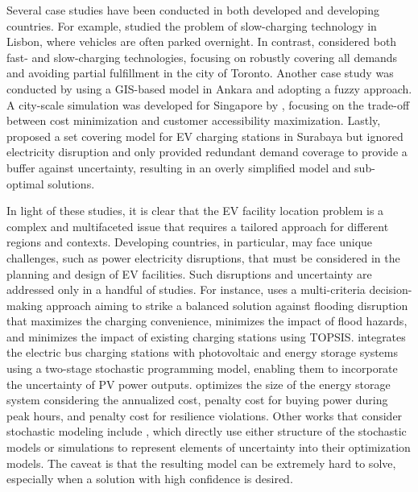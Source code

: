 \documentclass[preprint]{oscmjournal}
\theoremstyle{remark}
\begin{document}
Several case studies have been conducted in both developed and developing countries. For example, \textcite{frade2011optimal} studied the problem of slow-charging technology in Lisbon, where vehicles are often parked overnight. In contrast, \textcite{huang2016design} considered both fast- and slow-charging technologies, focusing on robustly covering all demands and avoiding partial fulfillment in the city of Toronto. Another case study was conducted by \textcite{erbacs2018optimal} using a GIS-based model in Ankara and adopting a fuzzy approach. A city-scale simulation was developed for Singapore by \textcite{bi2017simulation}, focusing on the trade-off between cost minimization and customer accessibility maximization. Lastly, \textcite{amilia2022designing} proposed a set covering model for EV charging stations in Surabaya but ignored electricity disruption and only provided redundant demand coverage to provide a buffer against uncertainty, resulting in an overly simplified model and sub-optimal solutions.

In light of these studies, it is clear that the EV facility location problem is a complex and multifaceted issue that requires a tailored approach for different regions and contexts. Developing countries, in particular, may face unique challenges, such as power electricity disruptions, that must be considered in the planning and design of EV facilities. Such disruptions and uncertainty are addressed only in a handful of studies. For instance, \textcite{zhang2023optimal} uses a multi-criteria decision-making approach aiming to strike a balanced solution against flooding disruption that maximizes the charging convenience, minimizes the impact of flood hazards, and minimizes the impact of existing charging stations using TOPSIS. \textcite{liu2022optimal} integrates the electric bus charging stations with photovoltaic and energy storage systems using a two-stage stochastic programming model, enabling them to incorporate the uncertainty of PV power outputs. \textcite{hussain2020optimal} optimizes the size of the energy storage system considering the annualized cost, penalty cost for buying power during peak hours, and penalty cost for resilience violations. Other works that consider stochastic modeling include \textcite{hosseini2015refueling, yildiz2019urban, alhazmi2017optimal, li2016multi, ren2019location, vazifeh2019optimizing, speth2022public}, which directly use either structure of the stochastic models or simulations to represent elements of uncertainty into their optimization models. The caveat is that the resulting model can be extremely hard to solve, especially when a solution with high confidence is desired.
\end{document}
